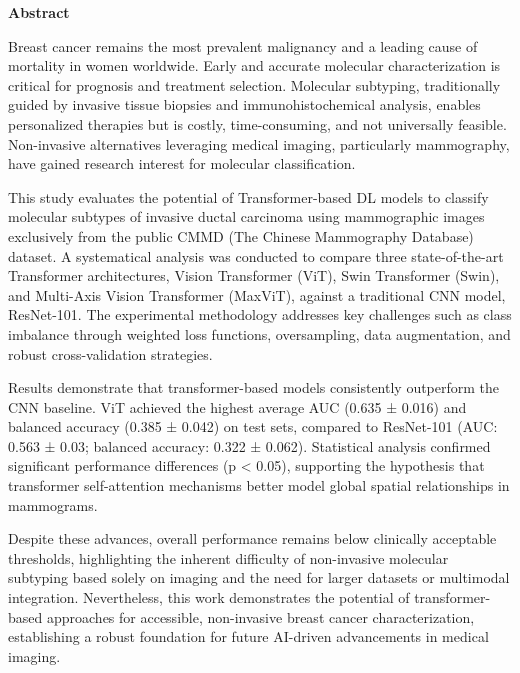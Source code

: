 \documentclass[a4paper,10pt]{book}
\begin{document}
\newpage
{}
\noindent \textbf{\large Abstract}

Breast cancer remains the most prevalent malignancy and a leading cause of mortality in women worldwide. Early and accurate molecular characterization is critical for prognosis and treatment selection. Molecular subtyping, traditionally guided by invasive tissue biopsies and immunohistochemical analysis, enables personalized therapies but is costly, time-consuming, and not universally feasible. Non-invasive alternatives leveraging medical imaging, particularly mammography, have gained research interest for molecular classification.

This study evaluates the potential of Transformer-based DL models to classify molecular subtypes of invasive ductal carcinoma using mammographic images exclusively from the public CMMD (The Chinese Mammography Database)  dataset. A systematical analysis was conducted to compare three state-of-the-art Transformer architectures, Vision Transformer (ViT), Swin Transformer (Swin), and Multi-Axis Vision Transformer (MaxViT), against a traditional CNN model, ResNet-101. The experimental methodology addresses key challenges such as class imbalance through weighted loss functions, oversampling, data augmentation, and robust cross-validation strategies.

Results demonstrate that transformer-based models consistently outperform the CNN baseline. ViT achieved the highest average AUC (0.635 ± 0.016) and balanced accuracy (0.385 ± 0.042) on test sets, compared to ResNet-101 (AUC: 0.563 ± 0.03; balanced accuracy: 0.322 ± 0.062). Statistical analysis confirmed significant performance differences (p < 0.05), supporting the hypothesis that transformer self-attention mechanisms better model global spatial relationships in mammograms.

Despite these advances, overall performance remains below clinically acceptable thresholds, highlighting the inherent difficulty of non-invasive molecular subtyping based solely on imaging and the need for larger datasets or multimodal integration. Nevertheless, this work demonstrates the potential of transformer-based approaches for accessible, non-invasive breast cancer characterization, establishing a robust foundation for future AI-driven advancements in medical imaging.

\end{document}
